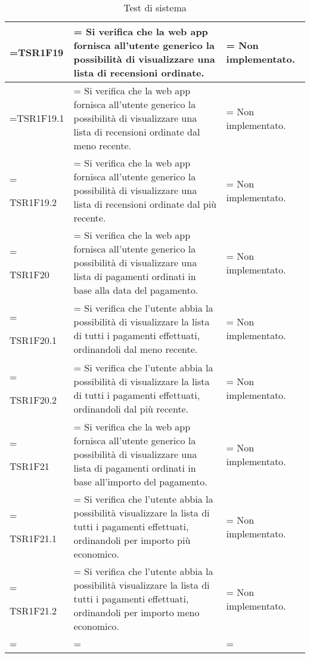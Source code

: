 \begin{xltabular}{\textwidth} {
            >{\hsize\linewidth=\hsize}X
            >{\hsize\linewidth=\hsize}X
            >{\hsize\linewidth=\hsize}X
        }
        TSR1F19 &
        Si verifica che la web app fornisca all'utente generico la possibilità di visualizzare una lista di recensioni ordinate. &
        Non implementato. 
        \\ \hline

        TSR1F19.1 &
        Si verifica che la web app fornisca all'utente generico la possibilità di visualizzare una lista di recensioni ordinate dal meno recente. &
        Non implementato. 
        \\ \hline

        TSR1F19.2 &
        Si verifica che la web app fornisca all'utente generico la possibilità di visualizzare una lista di recensioni ordinate dal più recente. &
        Non implementato. 
        \\ \hline

        TSR1F20 &
        Si verifica che la web app fornisca all'utente generico la possibilità di visualizzare una lista di pagamenti ordinati in base alla data del pagamento. &
        Non implementato. 
        \\ \hline

        TSR1F20.1 &
        Si verifica che l'utente abbia la possibilità di visualizzare la lista di tutti i pagamenti
        effettuati, ordinandoli dal meno recente. &
        Non implementato.
        \\ \hline

        TSR1F20.2 &
        Si verifica che l'utente abbia la possibilità di visualizzare la lista di tutti i pagamenti
        effettuati, ordinandoli dal più recente. &
        Non implementato.
        \\ \hline

        TSR1F21 &
        Si verifica che la web app fornisca all'utente generico la possibilità di visualizzare una lista di pagamenti ordinati in base all'importo del pagamento. &
        Non implementato. 
        \\ \hline

        TSR1F21.1 &
        Si verifica che l'utente abbia la possibilità visualizzare la lista di tutti i pagamenti
        effettuati, ordinandoli per importo più economico. &
        Non implementato.
        \\ \hline
        
        TSR1F21.2 &
        Si verifica che l'utente abbia la possibilità visualizzare la lista di tutti i pagamenti
        effettuati, ordinandoli per importo meno economico. &
        Non implementato.
        \\ \hline


        \caption{Test di sistema}
    \end{xltabular}

